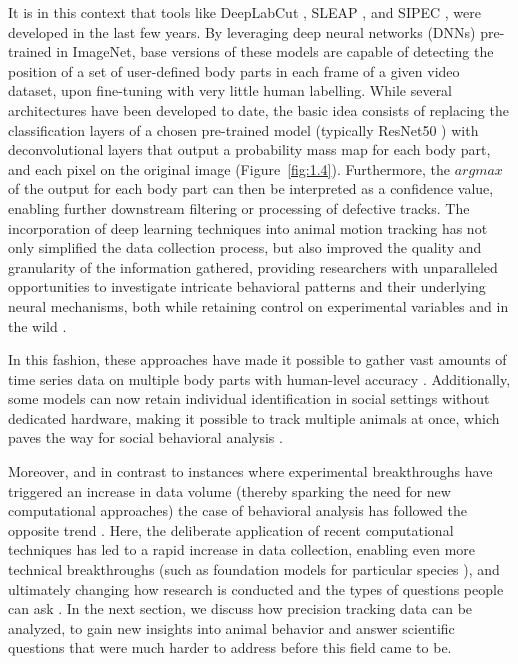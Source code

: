 It is in this context that tools like DeepLabCut \cite{Mathis2018DeepLabCut:Learning}, SLEAP \cite{Pereira2022SLEAP:Tracking}, and SIPEC \cite{Marks2022Deep-learning-basedEnvironments}, were developed in the last few years. By leveraging deep neural networks (DNNs) pre-trained in ImageNet, base versions of these models are capable of detecting the position of a set of user-defined body parts in each frame of a given video dataset, upon fine-tuning with very little human labelling. While several architectures have been developed to date, the basic idea consists of replacing the classification layers of a chosen pre-trained model (typically ResNet50 \cite{He2015DeepRecognition}) with deconvolutional layers that output a probability mass map for each body part, and each pixel on the original image (Figure~\ref{fig:1.4}). Furthermore, the $argmax$ of the output for each body part can then be interpreted as a confidence value, enabling further downstream filtering or processing of defective tracks. The incorporation of deep learning techniques into animal motion tracking has not only simplified the data collection process, but also improved the quality and granularity of the information gathered, providing researchers with unparalleled opportunities to investigate intricate behavioral patterns and their underlying neural mechanisms, both while retaining control on experimental variables and in the wild \cite{Tuia2022PerspectivesConservation}.

In this fashion, these approaches have made it possible to gather vast amounts of time series data on multiple body parts with human-level accuracy \cite{Sturman2020DeepSolutions}. Additionally, some models can now retain individual identification in social settings without dedicated hardware, making it possible to track multiple animals at once, which paves the way for social behavioral analysis \cite{Pereira2022SLEAP:Tracking, Lauer2022Multi-animalDeepLabCut}. 

Moreover, and in contrast to instances where experimental breakthroughs have triggered an increase in data volume (thereby sparking the need for new computational approaches) the case of behavioral analysis has followed the opposite trend \cite{Miranda2023IncreasingBehaviors}. Here, the deliberate application of recent computational techniques has led to a rapid increase in data collection, enabling even more technical breakthroughs (such as foundation models for particular species \cite{Ye2022SuperAnimalBehavior}), and ultimately changing how research is conducted and the types of questions people can ask \cite{Mathis2020APerspectives}. In the next section, we discuss how precision tracking data can be analyzed, to gain new insights into animal behavior and answer scientific questions that were much harder to address before this field came to be.

